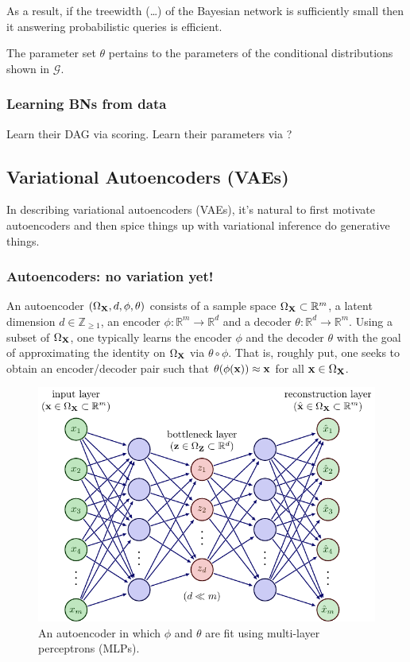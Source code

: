 \documentclass[11pt]{article}
\begin{document}
As a result, if the treewidth (\dots) of the Bayesian network is sufficiently small then it answering probabilistic queries is efficient.

The parameter set $\theta$ pertains to the parameters of the conditional distributions shown in $\mathcal{G}$.

\subsubsection{Learning BNs from data}
Learn their DAG via scoring. Learn their parameters via ?

\subsection{Variational Autoencoders (VAEs)}
In describing variational autoencoders (VAEs), it's natural to first motivate autoencoders and then spice things up with variational inference do generative things.

\subsubsection{Autoencoders: no variation yet!}
\label{sec:autoencoders}
An autoencoder $(\Omega_{\mathbf{X}},d,\phi,\theta)$ consists of a sample space $\Omega_{\mathbf{X}}\subset\mathbb{R}^m$, a latent dimension $d\in\mathbb{Z}_{\geq1}$, an encoder $\phi:\mathbb{R}^m\to\mathbb{R}^d$ and a decoder $\theta:\mathbb{R}^d\to\mathbb{R}^m$. Using a subset of $\Omega_{\mathbf{X}}$, one typically learns the encoder $\phi$ and the decoder $\theta$ with the goal of approximating the identity on $\Omega_{\mathbf{X}}$ via $\theta\circ \phi$. That is, roughly put, one seeks to obtain an encoder/decoder pair such that $\theta(\phi(\mathbf{x}))\approx\mathbf{x}$ for all $\mathbf{x}\in\Omega_{\mathbf{X}}$.

\begin{figure}[t]
    \centering
    \includegraphics[width=\columnwidth]{./figures/generative_models/AE_autoencoder.pdf}
    \caption{An autoencoder in which $\phi$ and $\theta$ are fit using multi-layer perceptrons (MLPs).}
    \label{fig:autoencoder}
\end{figure}
\end{document}

